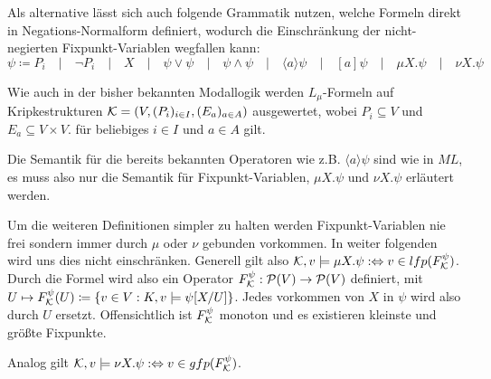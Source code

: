  Als alternative lässt sich auch folgende Grammatik nutzen, welche Formeln direkt in Negations-Normalform definiert, wodurch die Einschränkung der nicht-negierten Fixpunkt-Variablen wegfallen kann:
\[\psi \coloneqq P_i \quad\vert\quad \neg P_i \quad\vert\quad X \quad\vert\quad \psi\lor \psi \quad\vert\quad \psi \land \psi \quad\vert\quad \langle a \rangle \psi \quad\vert\quad [a]\psi \quad\vert\quad \mu X.\psi \quad\vert\quad \nu X.\psi\]

Wie auch in der bisher bekannten Modallogik werden $L_\mu$-Formeln auf Kripkestrukturen $\mathcal{K}=(V,(P_i)_{i\in I}, (E_a)_{a\in A})$ ausgewertet, wobei $P_i\subseteq V$ und $E_a\subseteq V\times V$. für beliebiges $i\in I$ und $a\in A$ gilt.

Die Semantik für die bereits bekannten Operatoren wie z.B. $\langle a \rangle \psi$ sind wie in $ML$, es muss also nur die Semantik für Fixpunkt-Variablen, $\mu X.\psi$ und $\nu X.\psi$ erläutert werden.

Um die weiteren Definitionen simpler zu halten werden Fixpunkt-Variablen nie frei sondern immer durch $\mu$ oder $\nu$ gebunden vorkommen. 
In weiter folgenden wird uns dies nicht einschränken. Generell gilt also $\mathcal{K},v\models \mu X.\psi :\Leftrightarrow v \in lfp(F^\psi_{\mathcal{K}})$. 
Durch die Formel wird also ein Operator $F^\psi_{\mathcal{K}}: \mathcal{P}(V)\to \mathcal{P}(V)$ definiert, mit $U\mapsto F^\psi_{\mathcal{K}}(U)\coloneqq \{v\in V : K,v \models \psi [X / U]\}$. 
Jedes vorkommen von $X$ in $\psi$ wird also durch $U$ ersetzt. Offensichtlich ist $F^\psi_{\mathcal{K}}$ monoton und es existieren kleinste und größte Fixpunkte.

Analog gilt $\mathcal{K}, v \models \nu X.\psi :\Leftrightarrow v \in gfp(F^\psi_{\mathcal{K}})$.

